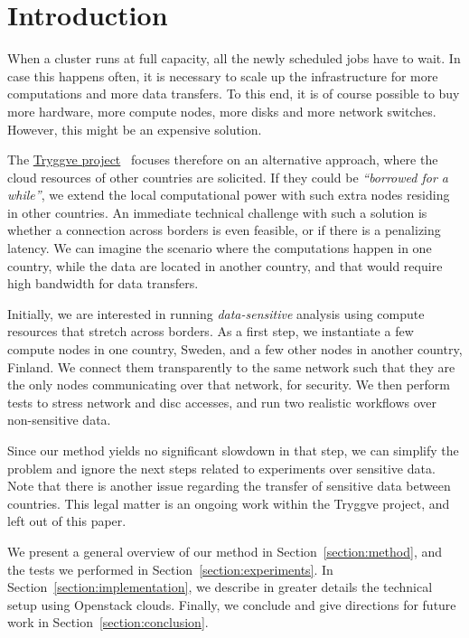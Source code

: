 \section{Introduction}
\label{section:intro}

When a cluster runs at full capacity, all the newly scheduled jobs
have to wait. In case this happens often, it is necessary to scale up
the infrastructure for more computations and more data transfers. To
this end, it is of course possible to buy more hardware, \ie more
compute nodes, more disks and more network switches. However, this
might be an expensive solution.

The \href{https://wiki.neic.no/wiki/Tryggve}{Tryggve
  project}~\cite{tryggve} focuses therefore on an alternative
approach, where the cloud resources of other countries are solicited.
%
If they could be \emph{``borrowed for a while''}, we extend the local
computational power with such extra nodes residing in other countries.
%
An immediate technical challenge with such a solution is whether a
connection across borders is even feasible, or if there is a
penalizing latency. We can imagine the scenario where the computations
happen in one country, while the data are located in another country,
and that would require high bandwidth for data transfers.

Initially, we are interested in running \emph{data-sensitive}
analysis using compute resources that stretch across borders.
%
As a first step, we instantiate a few compute nodes in one country,
Sweden, and a few other nodes in another country, Finland. We
connect them transparently to the same network such that they are
the only nodes communicating over that network, for security. We then
perform tests to stress network and disc accesses, and run two
realistic workflows over non-sensitive data.

Since our method yields no significant slowdown in that step, we
can simplify the problem and ignore the next steps related to
experiments over sensitive data.
%
Note that there is another issue regarding the transfer of sensitive
data between countries. This legal matter is an ongoing work within
the Tryggve project, and left out of this paper.

We present a general overview of our method in
Section~\ref{section:method}, and the tests we performed in
Section~\ref{section:experiments}.
%
In Section~\ref{section:implementation}, we describe in greater
details the technical setup using Openstack clouds.
%
Finally, we conclude and give directions for future work in
Section~\ref{section:conclusion}.
